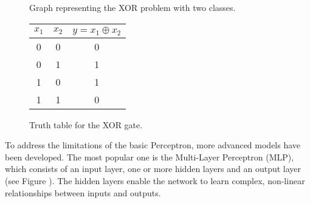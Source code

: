 \documentclass[11pt,english,listoffigures,listoftables]{tfgetsinf}
\begin{document}
\begin{figure}
\centering
{}
\caption{Graph representing the XOR problem with two classes.}
\label{fig:xor}
\end{figure}

\begin{figure}
    \centering
    \begin{tabular}{|c|c|c|}
        \hline
        $x_1$ & $x_2$ & $y = x_1 \oplus x_2$ \\
        \hline
        0 & 0 & 0 \\
        0 & 1 & 1 \\
        1 & 0 & 1 \\
        1 & 1 & 0 \\
        \hline
    \end{tabular}
    \caption{Truth table for the XOR gate.}
    \label{fig:xor_table}
\end{figure}

To address the limitations of the basic Perceptron, more advanced models have been developed. The most popular one is the Multi-Layer Perceptron (MLP), which consists of an input layer, one or more hidden layers and an output layer (see Figure ). The hidden layers enable the network to learn complex, non-linear relationships between inputs and outputs.
\end{document}
